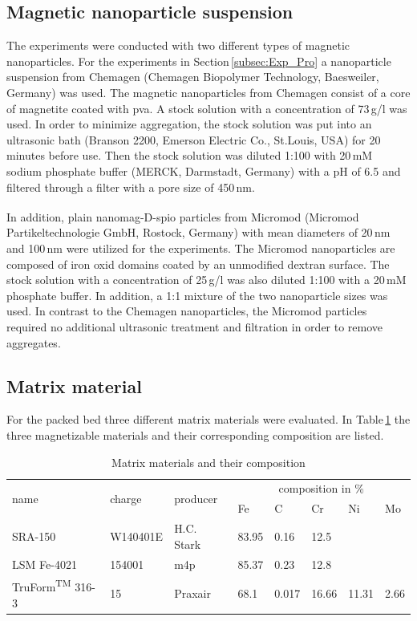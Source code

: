 \subsection{Magnetic nanoparticle suspension}
\label{subsec:Mag_nanoparticles}
The experiments were conducted with two different types of magnetic nanoparticles. For the experiments in Section\,\ref{subsec:Exp_Pro} a nanoparticle suspension from Chemagen (Chemagen Biopolymer Technology, Baesweiler, Germany) was used. The magnetic nanoparticles from Chemagen consist of a core of magnetite coated with \gls{pva}. A stock solution with a concentration of 73\,g/l was used. In order to minimize aggregation, the stock solution was put into an ultrasonic bath (Branson 2200, Emerson Electric Co., St.Louis, USA) for 20 minutes before use. Then the stock solution was diluted 1:100 with 20\,mM sodium phosphate buffer (MERCK, Darmstadt, Germany) with a pH of 6.5 and filtered through a filter with a pore size of 450\,nm.
 
In addition,  plain nanomag\textsuperscript{\textregistered}-D-spio particles from Micromod (Micromod Partikeltechnologie GmbH, Rostock, Germany) with mean diameters of 20\,nm and 100\,nm were utilized for the experiments. The Micromod nanoparticles are composed of iron oxid domains coated by an unmodified dextran surface. The stock solution with a concentration of 25\,g/l was also diluted 1:100 with a 20\,mM phosphate buffer. In addition, a 1:1 mixture of the two nanoparticle sizes was used. In contrast to the Chemagen nanoparticles, the Micromod particles required no additional ultrasonic treatment and filtration in order to remove aggregates.     

\subsection{Matrix material}
\label{subsec:Matrix_mat}
For the packed bed three different matrix materials were evaluated. In Table\,\ref{table:mat_material} the three magnetizable materials and their corresponding composition are listed.    

\begin{table}[H]
\centering
\caption{Matrix materials and their composition}
\label{table:mat_material}
\begin{tabularx}{\textwidth}{XXXXXXXX}\hline
\multirow{2}{*}{name} & \multirow{2}{*}{charge} & \multirow{2}{*}{producer} & \multicolumn{5}{c}{composition in \%}  \\
& & & Fe & C & Cr & Ni & Mo \\
\hline\hline
SRA-150 & W140401E & H.C. Stark & 83.95 & 0.16 & 12.5  & & \\
LSM Fe-4021 & 154001 & m4p & 85.37 & 0.23 & 12.8 & & \\
TruForm\textsuperscript{TM} 316-3 & 15 & Praxair & 68.1 & 0.017 & 16.66 &11.31& 2.66\\
\hline
\end{tabularx}
\end{table}

